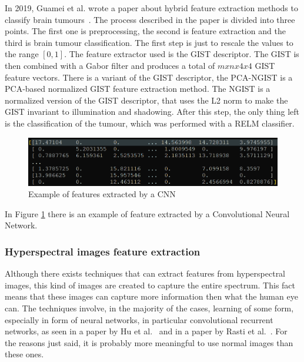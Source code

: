 \documentclass[conference]{IEEEtran}
\begin{document}
					\noindent In 2019, Guamei et al. wrote a paper about hybrid feature extraction methods to classify brain tumours~\cite{gumaei2019hybrid}. The process described in the paper is divided into three points. The 
					first one is preprocessing, the second is feature extraction and the third is brain tumour classification. The first step is just to rescale the values to the range $[0,1]$. The feature extractor 
					used is the GIST descriptor. The GIST is then combined with a Gabor filter and produces a total of $mxnx4x4$ GIST feature vectors. There is a variant of the GIST descriptor, the 
					PCA-NGIST is a PCA-based normalized GIST feature extraction method. The NGIST is a normalized version of the GIST descriptor, that uses the L2 norm to make the GIST invariant to illumination and shadowing. 
					After this step, the only thing left is the classification of the tumour, which was performed with a RELM classifier. 
					
					\begin{figure}[!ht]
						\centerline{\includegraphics[width=\linewidth]{imgs/cnn_features.png}}
						\caption{Example of features extracted by a CNN}
						\label{fig:4}
					\end{figure}	
					
					\noindent In Figure \ref{fig:4} there is an example of feature extracted by a Convolutional Neural Network. 
					
				\subsubsection{Hyperspectral images feature extraction}
					
					Although there exists techniques that can extract features from hyperspectral images, this kind of images are created to capture the entire spectrum. This fact means that these images can capture 
					more information then what the human eye can. The techniques involve, in the majority of the cases, learning of some form, especially in form of neural networks, in particular convolutional recurrent 
					networks, as seen in a paper by Hu et al.~\cite{hu2020spatial} and in a paper by Rasti et al.~\cite{rasti2020feature}. For the reasons just said, it is probably more meaningful to use normal 
					images than these ones.
			
\end{document}
